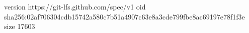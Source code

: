 version https://git-lfs.github.com/spec/v1
oid sha256:02af706304cdb15742a580c7b51a4907c63e8a3cde799fbe8ac69197e78f1f3e
size 17603
